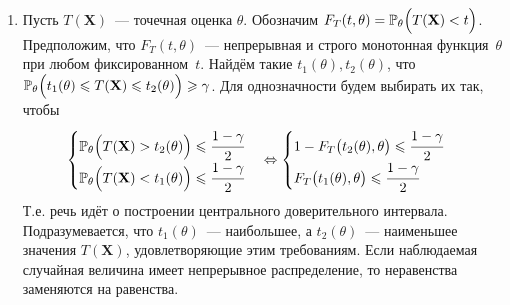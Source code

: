 \begin{enumerate}
    \item Пусть $T(\mathbf{X})$~--- точечная оценка $\theta$. 
        Обозначим $F_{T}(t, \theta)={\mathbb{P}_{\theta}\Bigl(T(\mathbf{X})<t\Bigr)}$. 
        Предположим, что $F_{T}(t,\theta)$~--- непрерывная и строго монотонная функция~$\theta$ при любом фиксированном~$t$. 
        Найдём такие $t_1(\theta), t_2(\theta)$, что ${\mathbb{P}_{\theta} \Bigl( t_1(\theta) \leqslant T(\mathbf{X}) \leqslant t_2(\theta) \Bigr) \geqslant \gamma}$.
        Для однозначности будем выбирать их так, чтобы
        \begin{equation*}
            \begin{cases}
                \mathbb{P}_{\theta} \Bigl( T(\mathbf{X}) > t_2(\theta) \Bigr) \leqslant \cfrac{1 - \gamma}{2} \\ 
                \mathbb{P}_{\theta} \Bigl( T(\mathbf{X}) < t_1(\theta) \Bigr) \leqslant \cfrac{1 - \gamma}{2} 
            \end{cases}
            \Leftrightarrow 
            \begin{cases}
                1 - F_{T}\bigl(t_2(\theta), \theta\bigr) \leqslant \cfrac{1 - \gamma}{2} \\
                F_{T}\bigl(t_1(\theta), \theta\bigr) \leqslant \cfrac{1 - \gamma}{2}
            \end{cases}
        \end{equation*}
        Т.е. речь идёт о построении центрального доверительного интервала.
        Подразумевается, что $t_1(\theta)$~--- наибольшее, а $t_2(\theta)$~--- наименьшее значения $T(\mathbf{X})$, удовлетворяющие этим требованиям.
        Если наблюдаемая случайная величина имеет непрерывное распределение, то неравенства заменяются на равенства.
        

\end{enumerate}
